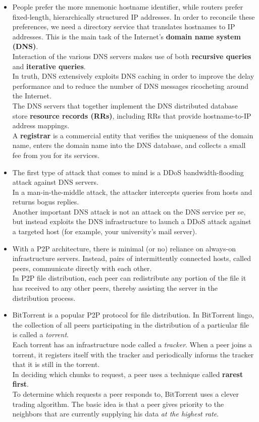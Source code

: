 \begin{itemize}
\item
People prefer the more mnemonic hostname identifier, while routers prefer fixed-length, hierarchically structured IP addresses. In order to reconcile these preferences, we need a directory service that translates hostnames to IP addresses. This is the main task of the Internet's \textbf{domain name system (DNS)}.\\
Interaction of the various DNS servers makes use of both \textbf{recursive queries} and \textbf{iterative queries}.\\
In truth, DNS extensively exploits DNS caching in order to improve the delay performance and to reduce the number of DNS messages ricocheting around the Internet.\\
The DNS servers that together implement the DNS distributed database store \textbf{resource records (RRs)}, including RRs that provide hostname-to-IP address mappings.\\
A \textbf{registrar} is a commercial entity that verifies the uniqueness of the domain name, enters the domain name into the DNS database, and collects a small fee from you for its services.

\item
The first type of attack that comes to mind is a DDoS bandwidth-flooding attack against DNS servers.\\
In a man-in-the-middle attack, the attacker intercepts queries from hosts and returns bogus replies.\\
Another important DNS attack is not an attack on the DNS service per se, but instead exploits the DNS infrastructure to launch a DDoS attack against a targeted host (for example, your university's mail server).

\item
With a P2P architecture, there is minimal (or no) reliance on always-on infrastructure servers. Instead, pairs of intermittently connected hosts, called peers, communicate directly with each other.\\
In P2P file distribution, each peer can redistribute any portion of the file it has received to any other peers, thereby assisting the server in the distribution process.

\item
BitTorrent is a popular P2P protocol for file distribution. In BitTorrent lingo, the collection of all peers participating in the distribution of a particular file is called a \textit{torrent}.\\
Each torrent has an infrastructure node called a \textit{tracker}. When a peer joins a torrent, it registers itself with the tracker and periodically informs the tracker that it is still in the torrent.\\
In deciding which chunks to request, a peer uses a technique called \textbf{rarest first}.\\
To determine which requests a peer responds to, BitTorrent uses a clever trading algorithm. The basic idea is that a peer gives priority to the neighbors that are currently supplying his data \textit{at the highest rate}.


\end{itemize}
